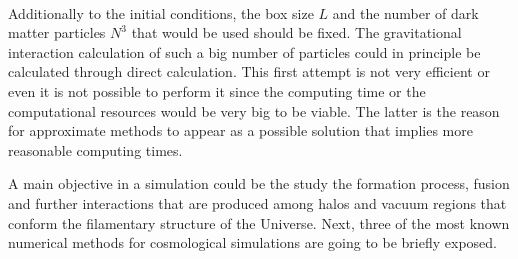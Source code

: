 \

Additionally to the initial conditions, the box size $L$ and the number of 
dark matter particles $N^3$ that would be used should be fixed. 
The gravitational interaction calculation of such a big number of particles
could in principle be calculated through direct calculation. This first
attempt is not very efficient or even it is not possible to perform it
since the computing time or the computational resources would be very 
big to be viable. The latter is the reason for approximate methods 
to appear as a possible solution that implies more reasonable computing times.

A main objective in a simulation could be the study the formation process, fusion and
further interactions that are produced among halos and vacuum regions that conform
the filamentary structure of the Universe. Next, three of the most known numerical 
methods for cosmological simulations are going to be briefly exposed.

